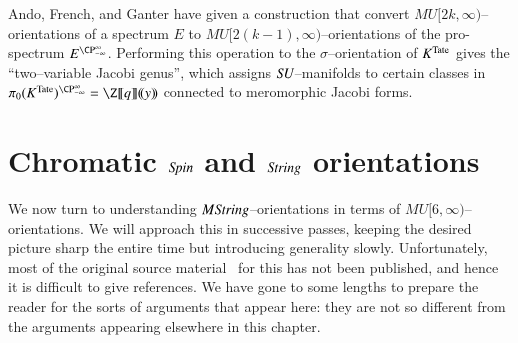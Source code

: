 \begin{remark}
Ando, French, and Ganter have given a construction that convert $MU[2k, \infty)$--orientations of a spectrum $E$ to $MU[2(k-1), \infty)$--orientations of the pro-spectrum $E^{\CP^\infty_{-\infty}}$.  Performing this operation to the $\sigma$--orientation of $K^{\mathrm{Tate}}$ gives the ``two--variable Jacobi genus'', which assigns $\mathit{SU}$--manifolds to certain classes in $\pi_0 (K^{\Tate})^{\CP^\infty_{-\infty}} = \Z\ps{q}(\!(y)\!)$ connected to meromorphic Jacobi forms.
\end{remark}













\section{Chromatic \texorpdfstring{$\mathit{Spin}$}{Spin} and \texorpdfstring{$\mathit{String}$}{String} orientations}

We now turn to understanding $M\mathit{String}$--orientations in terms of $MU[6, \infty)$--orientations.  We will approach this in successive passes, keeping the desired picture sharp the entire time but introducing generality slowly.  Unfortunately, most of the original source material~\cite{HAS,StricklandFSKS} for this has not been published, and hence it is difficult to give references.  We have gone to some lengths to prepare the reader for the sorts of arguments that appear here: they are not so different from the arguments appearing elsewhere in this chapter.

